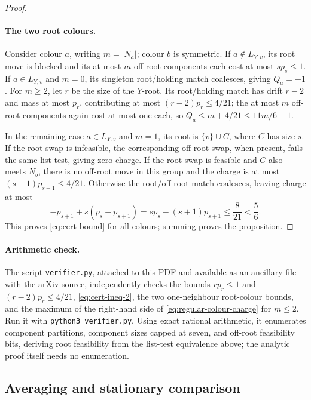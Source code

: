 \documentclass[11pt,reqno]{article}
\theoremstyle{plain}
\theoremstyle{definition}
\theoremstyle{remark}
\theoremstyle{definition}
\theoremstyle{remark}
\begin{document}
\begin{proof}
\paragraph{The two root colours.}
Consider colour \(a\), writing \(m=|N_a|\); colour \(b\) is symmetric.
If \(a\notin L_{Y,v}\), its root move is blocked and its at most \(m\)
off-root components each cost at most \(sp_s\le1\).
If \(a\in L_{Y,v}\) and \(m=0\), its singleton root/holding match
coalesces, giving \(Q_a=-1\).  For \(m\ge2\), let \(r\) be the size of
the \(Y\)-root.  Its root/holding match has drift \(r-2\) and mass at
most \(p_r\), contributing at most \((r-2)p_r\le4/21\); the at most \(m\)
off-root components again cost at most one each, so
\(Q_a\le m+4/21\le11m/6-1\).

In the remaining case \(a\in L_{Y,v}\) and \(m=1\), its root is
\(\{v\}\cup C\), where \(C\) has size \(s\).
If the root swap is infeasible, the corresponding off-root swap, when
present, fails the same list test, giving zero charge.  If the root swap
is feasible and \(C\) also meets \(N_b\), there is no off-root move in
this group and the charge is at most \((s-1)p_{s+1}\le4/21\).
Otherwise the root/off-root match coalesces, leaving charge at most
\[
  -p_{s+1}+s(p_s-p_{s+1})
   =sp_s-(s+1)p_{s+1}\le\frac8{21}<\frac56.
\]
This proves \eqref{eq:cert-bound} for all colours; summing proves the
proposition.
\end{proof}

\paragraph{Arithmetic check.}
\ifpdf
{}
\fi
The script \nolinkurl{verifier.py}, attached to this PDF and available as
an ancillary file with the arXiv source, independently checks the bounds
\(rp_r\le1\) and \((r-2)p_r\le4/21\), \eqref{eq:cert-ineq-2}, the two
one-neighbour root-colour bounds, and the maximum of the right-hand side
of \eqref{eq:regular-colour-charge} for \(m\le2\).  Run it with
\texttt{python3 verifier.py}.  Using exact rational arithmetic, it
enumerates component partitions, component sizes capped at seven, and
off-root feasibility bits, deriving root feasibility from the list-test
equivalence above; the analytic proof itself needs no enumeration.

\subsection{Averaging and stationary comparison}
\label{sec:activation-average}
\end{document}
